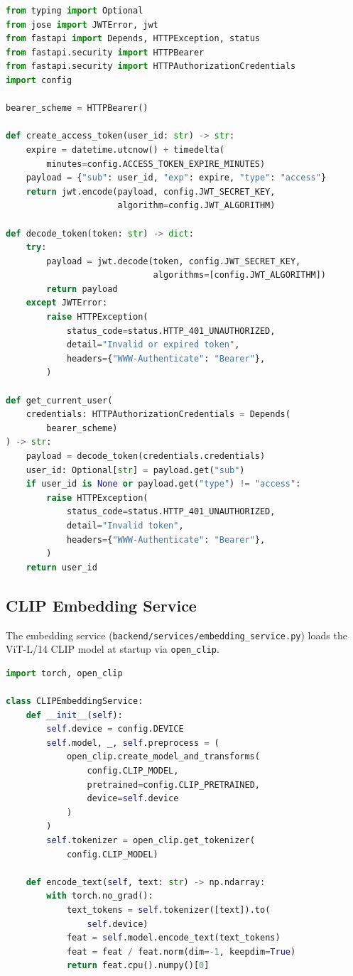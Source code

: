 \documentclass[12pt,a4paper,oneside]{report}
\begin{document}
\begin{lstlisting}[language=Python, caption={JWT token creation and
  authentication dependency (auth\_service.py)}]
from typing import Optional
from jose import JWTError, jwt
from fastapi import Depends, HTTPException, status
from fastapi.security import HTTPBearer
from fastapi.security import HTTPAuthorizationCredentials
import config

bearer_scheme = HTTPBearer()

def create_access_token(user_id: str) -> str:
    expire = datetime.utcnow() + timedelta(
        minutes=config.ACCESS_TOKEN_EXPIRE_MINUTES)
    payload = {"sub": user_id, "exp": expire, "type": "access"}
    return jwt.encode(payload, config.JWT_SECRET_KEY,
                      algorithm=config.JWT_ALGORITHM)

def decode_token(token: str) -> dict:
    try:
        payload = jwt.decode(token, config.JWT_SECRET_KEY,
                             algorithms=[config.JWT_ALGORITHM])
        return payload
    except JWTError:
        raise HTTPException(
            status_code=status.HTTP_401_UNAUTHORIZED,
            detail="Invalid or expired token",
            headers={"WWW-Authenticate": "Bearer"},
        )

def get_current_user(
    credentials: HTTPAuthorizationCredentials = Depends(
        bearer_scheme)
) -> str:
    payload = decode_token(credentials.credentials)
    user_id: Optional[str] = payload.get("sub")
    if user_id is None or payload.get("type") != "access":
        raise HTTPException(
            status_code=status.HTTP_401_UNAUTHORIZED,
            detail="Invalid token",
            headers={"WWW-Authenticate": "Bearer"},
        )
    return user_id
\end{lstlisting}

\subsection{CLIP Embedding Service}
The embedding service (\texttt{backend/services/embedding\_service.py})
loads the ViT-L/14 CLIP model at startup via \texttt{open\_clip}.

\begin{lstlisting}[language=Python, caption={CLIP image and text encoding
  (embedding\_service.py)}]
import torch, open_clip

class CLIPEmbeddingService:
    def __init__(self):
        self.device = config.DEVICE
        self.model, _, self.preprocess = (
            open_clip.create_model_and_transforms(
                config.CLIP_MODEL,
                pretrained=config.CLIP_PRETRAINED,
                device=self.device
            )
        )
        self.tokenizer = open_clip.get_tokenizer(
            config.CLIP_MODEL)
            
    def encode_text(self, text: str) -> np.ndarray:
        with torch.no_grad():
            text_tokens = self.tokenizer([text]).to(
                self.device)
            feat = self.model.encode_text(text_tokens)
            feat = feat / feat.norm(dim=-1, keepdim=True)
            return feat.cpu().numpy()[0]
\end{lstlisting}
\end{document}
